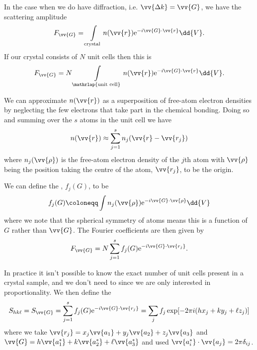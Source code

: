 \documentclass[fleqn]{NotesClass}
\newcommand*{\e}{\mathrm{e}}
\begin{document}
    In the case when we do have diffraction, i.e. \(\vv{\Delta k} = \vv{G}\), we have the scattering amplitude
    \begin{equation}
        F_{\vv{G}} = \int\limits_{\text{crystal}} n(\vv{r})\e^{-i\vv{G}\cdot\vv{r}}\dd{V}.
    \end{equation}
    If our crystal consists of \(N\) unit cells then this is 
    \begin{equation}
        F_{\vv{G}} = N\int\limits_{\mathrlap{\text{unit cell}}} n(\vv{r})\e^{-i\vv{G}\cdot\vv{r}}\dd{V}.
    \end{equation}
    
    We can approximate \(n(\vv{r})\) as a superposition of free-atom electron densities by neglecting the few electrons that take part in the chemical bonding.
    Doing so and summing over the \(s\) atoms in the unit cell we have
    \begin{equation}
        n(\vv{r}) \approx \sum_{j=1}^{s} n_j(\vv{r} - \vv{r_j})
    \end{equation}
    where \(n_j(\vv{\rho})\) is the free-atom electron density of the \(j\)th atom with \(\vv{\rho}\) being the position taking the centre of the atom, \(\vv{r_j}\), to be the origin.
    
    We can define the , \(f_j(G)\), to be
    \begin{equation}
        f_j(G) \coloneqq \int n_j(\vv{\rho}) \e^{-i\vv{G}\cdot\vv{\rho}}\dd{V}
    \end{equation}
    where we note that the spherical symmetry of atoms means this is a function of \(G\) rather than \(\vv{G}\).
    The Fourier coefficients are then given by
    \begin{equation}
        F_{\vv{G}} = N\sum_{j=1}^{s} f_j(G)\e^{-i\vv{G}\cdot\vv{r_j}}.
    \end{equation}
    
    In practice it isn't possible to know the exact number of unit cells present in a crystal sample, and we don't need to since we are only interested in proportionality.
    We then define the 
    \begin{equation}
        S_{hk\ell} = S_{\vv{G}} = \sum_{j=1}^{s} f_j(G)\e^{-i\vv{G}\cdot\vv{r_j}} = \sum_{j} f_j \exp[-2\pi i(hx_j + ky_j + \ell z_j)]
    \end{equation}
    where we take \(\vv{r_j} = x_j\vv{a_1} + y_j\vv{a_2} + z_j\vv{a_3}\) and \(\vv{G} = h\vv{a_1^*} + k\vv{a_2^*} + \ell\vv{a_3^*}\) and used \(\vv{a_i^*}\cdot\vv{a_j} = 2\pi\delta_{ij}\).
    
\end{document}

